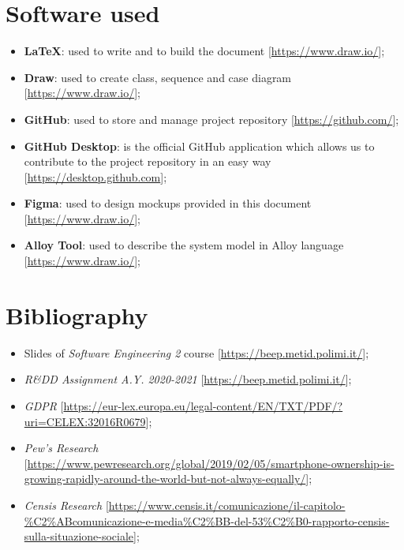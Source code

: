 \section{Software used}

\begin{itemize}
\item \textbf{\LaTeX}: used to write and to build the document [\url{https://www.draw.io/}];
\item\textbf{Draw}: used to create class, sequence and case diagram [\url{https://www.draw.io/}];
\item\textbf{GitHub}: used to store and manage project repository [\url{https://github.com/}];
\item\textbf{GitHub Desktop}: is the official GitHub application which allows us to contribute to the project repository in an easy way [\url{https://desktop.github.com}];
\item\textbf{Figma}: used to design mockups provided in this document [\url{https://www.draw.io/}];
\item\textbf{Alloy Tool}: used to describe the system model in Alloy language [\url{https://www.draw.io/}];
\begin{comment}
\item\textbf{}:;
\item\textbf{}:;
\item\textbf{}:;
\end{comment}
\end{itemize}



\section{Bibliography}
\begin{itemize}
\item Slides of \textit{Software Engineering 2} course [\url{https://beep.metid.polimi.it/}];
\item \textit{R\&DD Assignment A.Y. 2020-2021} 
[\url{https://beep.metid.polimi.it/}];
\item \textit{GDPR} 
[\url{https://eur-lex.europa.eu/legal-content/EN/TXT/PDF/?uri=CELEX:32016R0679}]; 
\item \textit{Pew's Research}
[\url{https://www.pewresearch.org/global/2019/02/05/smartphone-ownership-is-growing-rapidly-around-the-world-but-not-always-equally/}];
\item \textit{Censis Research}
[\url{https://www.censis.it/comunicazione/il-capitolo-\%C2\%ABcomunicazione-e-media\%C2\%BB-del-53\%C2\%B0-rapporto-censis-sulla-situazione-sociale}];
\end{itemize}

